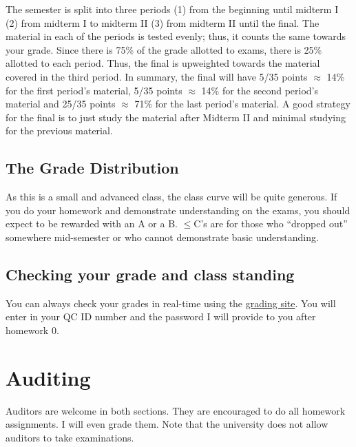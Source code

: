 \documentclass[12pt]{article}
\newcommand{\qu}[1]{``#1''}
\begin{document}
The semester is split into three periods (1) from the beginning until midterm I (2) from midterm I to midterm II (3) from midterm II until the final. The material in each of the periods is tested evenly; thus, it counts the same towards your grade. Since there is 75\% of the grade allotted to exams, there is 25\% allotted to each period. Thus, the final is upweighted towards the material covered in the third period. In summary, the final will have 5/35 points $\approx$ 14\% for the first period's material, 5/35 points $\approx$ 14\% for the second period's material and 25/35 points $\approx$ 71\% for the last period's material. A good strategy for the final is to just study the material after Midterm II and minimal studying for the previous material.

\subsection*{The Grade Distribution}

As this is a small and advanced class, the class curve will be quite generous. If you do your homework and demonstrate understanding on the exams, you should expect to be rewarded with an A or a B. $\leq$C's are for those who \qu{dropped out} somewhere mid-semester or who cannot demonstrate basic understanding.

\subsection*{Checking your grade and class standing}

You can always check your grades in real-time using the \href{http://gradesly.com}{grading site}. You will enter in your QC ID number and the password I will provide to you after homework 0.



\section*{Auditing}

Auditors are welcome in both sections. They are encouraged to do all homework assignments. I will even grade them. Note that the university does not allow auditors to take examinations.
\end{document}

